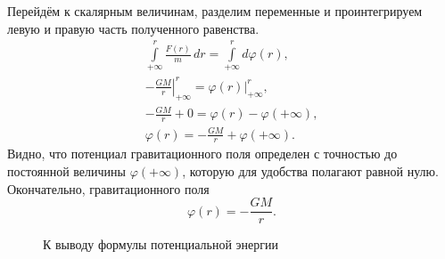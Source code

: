 Перейдём к скалярным величинам, разделим переменные и проинтегрируем левую и правую часть полученного равенства.
\begin{gather*}
	\int\limits_{+\infty}^{r} \frac{ F(r) }{m} \,d r = \int\limits_{+\infty}^{r} d\varphi(r),\\
	-\left.\frac{GM}{r}\right|_{+\infty}^r = \varphi(r)|_{+\infty}^r,\\
	-\frac{GM}{r} + 0 = \varphi(r) - \varphi(+\infty),\\
	\varphi(r) = -\frac{GM}{r} + \varphi(+\infty).
\end{gather*} 
Видно, что потенциал гравитационного поля определен с точностью до постоянной величины $\varphi(+\infty)$, которую для удобства полагают равной нулю. Окончательно,  гравитационного поля
\begin{equation}
	\varphi(r) = -\frac{GM}{r}.
\end{equation}

\begin{wrapfigure}[12]{r}{0.47\tw}
    \centering
    \vspace{-1pc}
    \caption{К выводу формулы потенциальной энергии}
    \label{pic:potential-energy}    
\end{wrapfigure}

